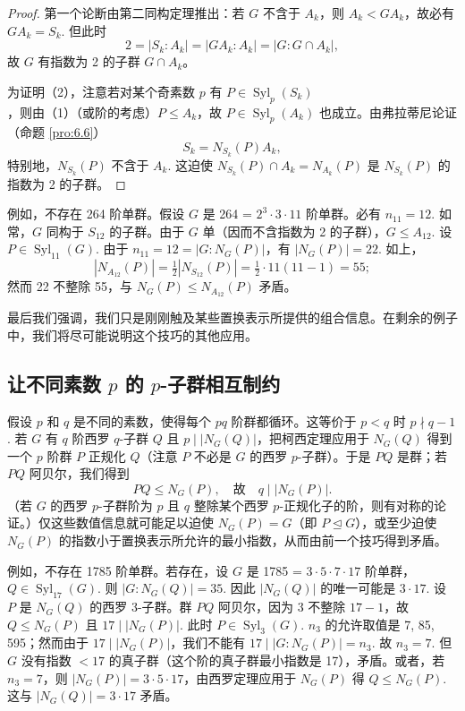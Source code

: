 \begin{proof}
第一个论断由第二同构定理推出：若 \(G\) 不含于 \(A_k\)，则 \(A_k < GA_k\)，故必有 \(GA_k = S_k\). 但此时
\[
2 = |S_k : A_k| = |GA_k : A_k| = |G : G \cap A_k|,
\]
故 \(G\) 有指数为 2 的子群 \(G \cap A_k\)。

为证明（2），注意若对某个奇素数 \(p\) 有 \(P \in \operatorname{Syl}_p(S_k)\)，则由（1）（或阶的考虑）\(P \leq A_k\)，故 \(P \in \operatorname{Syl}_p(A_k)\) 也成立。由弗拉蒂尼论证（命题 \ref{pro:6.6}）
\[
S_k = N_{S_k}(P)A_k,
\]
特别地，\(N_{S_k}(P)\) 不含于 \(A_k\). 这迫使 \(N_{S_k}(P) \cap A_k = N_{A_k}(P)\) 是 \(N_{S_k}(P)\) 的指数为 2 的子群。
\end{proof}

例如，不存在 264 阶单群。假设 \(G\) 是 264 = \(2^3 \cdot 3 \cdot 11\) 阶单群。必有 \(n_{11} = 12\). 如常，\(G\) 同构于 \(S_{12}\) 的子群。由于 \(G\) 单（因而不含指数为 2 的子群），\(G \leq A_{12}\). 设 \(P \in \operatorname{Syl}_{11}(G)\). 由于 \(n_{11} = 12 = |G : N_G(P)|\)，有 \(|N_G(P)| = 22\). 如上，
\[
|N_{A_{12}}(P)| = \tfrac{1}{2}|N_{S_{12}}(P)| = \tfrac{1}{2}\cdot 11(11-1) = 55;
\]
然而 22 不整除 55，与 \(N_G(P) \leq N_{A_{12}}(P)\) 矛盾。

最后我们强调，我们只是刚刚触及某些置换表示所提供的组合信息。在剩余的例子中，我们将尽可能说明这个技巧的其他应用。

\subsection*{让不同素数 \(p\) 的 \(p\)-子群相互制约}

假设 \(p\) 和 \(q\) 是不同的素数，使得每个 \(pq\) 阶群都循环。这等价于 \(p < q\) 时 \(p \nmid q-1\). 若 \(G\) 有 \(q\) 阶西罗 \(q\)-子群 \(Q\) 且 \(p \mid |N_G(Q)|\)，把柯西定理应用于 \(N_G(Q)\) 得到一个 \(p\) 阶群 \(P\) 正规化 \(Q\)（注意 \(P\) 不必是 \(G\) 的西罗 \(p\)-子群）。于是 \(PQ\) 是群；若 \(PQ\) 阿贝尔，我们得到
\[
PQ \leq N_G(P), \quad \text{故} \quad q \mid |N_G(P)|.
\]
（若 \(G\) 的西罗 \(p\)-子群阶为 \(p\) 且 \(q\) 整除某个西罗 \(p\)-正规化子的阶，则有对称的论证。）仅这些数值信息就可能足以迫使 \(N_G(P) = G\)（即 \(P \trianglelefteq G\)），或至少迫使 \(N_G(P)\) 的指数小于置换表示所允许的最小指数，从而由前一个技巧得到矛盾。

例如，不存在 1785 阶单群。若存在，设 \(G\) 是 1785 = \(3 \cdot 5 \cdot 7 \cdot 17\) 阶单群，\(Q \in \operatorname{Syl}_{17}(G)\). 则 \(|G : N_G(Q)| = 35\). 因此 \(|N_G(Q)|\) 的唯一可能是 \(3 \cdot 17\). 设 \(P\) 是 \(N_G(Q)\) 的西罗 3-子群。群 \(PQ\) 阿贝尔，因为 3 不整除 \(17-1\)，故 \(Q \leq N_G(P)\) 且 \(17 \mid |N_G(P)|\). 此时 \(P \in \operatorname{Syl}_3(G)\). \(n_3\) 的允许取值是 7, 85, 595；然而由于 \(17 \mid |N_G(P)|\)，我们不能有 \(17 \mid |G : N_G(P)| = n_3\). 故 \(n_3 = 7\). 但 \(G\) 没有指数 \(< 17\) 的真子群（这个阶的真子群最小指数是 17），矛盾。或者，若 \(n_3 = 7\)，则 \(|N_G(P)| = 3 \cdot 5 \cdot 17\)，由西罗定理应用于 \(N_G(P)\) 得 \(Q \leq N_G(P)\). 这与 \(|N_G(Q)| = 3 \cdot 17\) 矛盾。

